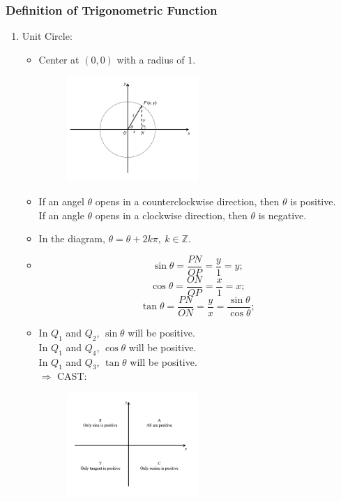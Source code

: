 \documentclass[12pt, a4paper]{article}
\def\Z{{\mathbb{Z}}}
\begin{document}
\subsubsection{Definition of Trigonometric Function}
\begin{enumerate}
  \item Unit Circle: 
  \begin{itemize}
    \item Center at $(0,0)$ with a radius of $1$.
    \begin{figure}[H]
      \centering
      \includegraphics[width=0.5\textwidth]{Fig.3.22.jpg}
    \end{figure}
    \item If an angel $\theta$ opens in a counterclockwise direction, then $\theta$ is positive. \\
    If an angle $\theta$ opens in a clockwise direction, then $\theta$ is negative. 
    \item In the diagram, $\theta=\theta+2k\pi,\ k\in\Z.$
    \item $$\sin\theta=\frac{PN}{OP}=\frac{y}{1}=y; $$
    $$\cos\theta=\frac{ON}{OP}=\frac{x}{1}=x; $$
    $$\tan\theta=\frac{PN}{ON}=\frac{y}{x}=\frac{\sin\theta}{\cos\theta}; $$
    \item In $Q_1$ and $Q_2$, $\sin\theta$ will be positive.\\
    In $Q_1$ and $Q_4$, $\cos\theta$ will be positive.\\
    In $Q_1$ and $Q_3$, $\tan\theta$ will be positive.\\
    $\Rightarrow$ CAST: 
    \begin{figure}[H]
      \centering
      \includegraphics[width=0.5\textwidth]{Fig.3.23.jpg}

\end{figure}
\end{itemize}
\end{enumerate}
\end{document}
